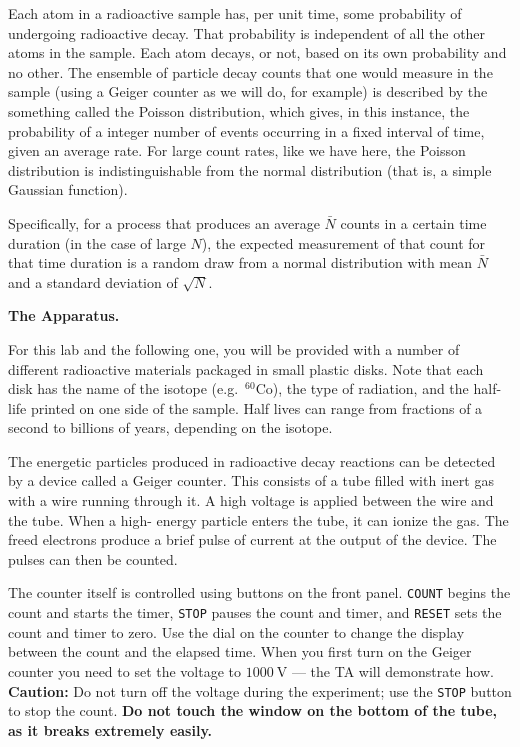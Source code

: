 Each atom in a radioactive sample has, per unit time, some probability of undergoing
radioactive decay. That probability is independent of all the other atoms in the sample.
Each atom decays, or not, based on its own probability and no other. The ensemble of
particle decay counts that one would measure in the sample (using a Geiger counter as we will
do, for example) is described by the something called the Poisson distribution, which
gives, in this instance, the probability of a integer number of events occurring in a fixed
interval of time, given an average rate. For large count rates, like we have here, the
Poisson distribution is indistinguishable from the normal distribution (that is, a simple
Gaussian function).

Specifically, for a process that produces an average $\bar{N}$ counts in a certain time duration (in the case of large $N$), the expected measurement of that count for that time duration is a
random draw from a normal distribution with mean $\bar{N}$ and a standard deviation of
$\sqrt{N}$.

	\begin{framed}
	\textbf{The Apparatus.}
	
	For this lab and the following one, you will be provided with a number of different radioactive materials packaged in small plastic disks. Note that each disk has the name of
	the isotope (e.g.\ $^{60}$Co), the type of radiation, and the half-life printed on one side of the
	sample. Half lives can range from fractions of a second to billions of years, depending on
	the isotope.
	
	The energetic particles produced in radioactive decay reactions can be detected by a
	device called a Geiger counter. This consists of a tube filled with inert gas with a wire
	running through it. A high voltage is applied between the wire and the tube. When a high-
	energy particle enters the tube, it can ionize the gas. The freed electrons produce a brief
	pulse of current at the output of the device. The pulses can then be counted.
	
	The counter itself is controlled using buttons on the front panel. \texttt{COUNT} begins the count
	and starts the timer, \texttt{STOP} pauses the count and timer, and \texttt{RESET} sets the count and
	timer to zero. Use the dial on the counter to change the display between the count and the
	elapsed time. When you first turn on the Geiger counter you need to set the voltage to
	$1000\:$V --- the TA will demonstrate how. \textbf{Caution:} Do not turn off the voltage during the
	experiment; use the \texttt{STOP} button to stop the count. \textbf{Do not touch the window on the
		bottom of the tube, as it breaks extremely easily.}
\end{framed}

